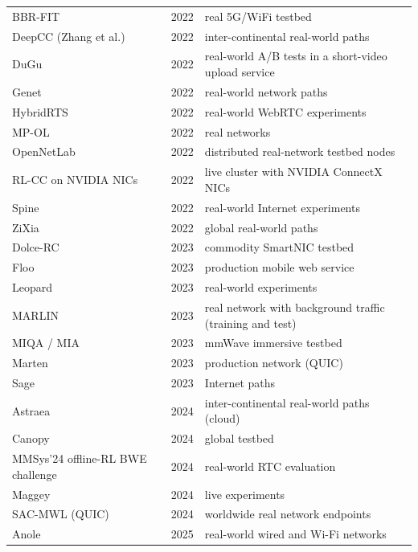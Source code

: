 \begin{small}
\begin{longtable}{@{}L{4.0cm}lL{8.6cm}@{}}
BBR-FIT~\cite{xie2022bbr} & 2022 & real 5G/WiFi testbed \\
DeepCC (Zhang et al.)~\cite{zhang2022deepcc} & 2022 & inter-continental real-world paths \\
DuGu~\cite{huang2022learned} & 2022 & real-world A/B tests in a short-video upload service \\
Genet~\cite{xia2022genet} & 2022 & real-world network paths \\
HybridRTS~\cite{zhang2022hybridrts} & 2022 & real-world WebRTC experiments \\
MP-OL~\cite{zhuang2022achieving} & 2022 & real networks \\
OpenNetLab~\cite{eo2022opennetlab} & 2022 & distributed real-network testbed nodes \\
RL-CC on NVIDIA NICs~\cite{fuhrer2023nvidia} & 2022 & live cluster with NVIDIA ConnectX NICs \\
Spine~\cite{tian2024spine} & 2022 & real-world Internet experiments \\
ZiXia~\cite{jia2022zixia} & 2022 & global real-world paths \\
Dolce-RC~\cite{ye2023data} & 2023 & commodity SmartNIC testbed \\
Floo~\cite{zhang2023floo} & 2023 & production mobile web service \\
Leopard~\cite{liu2023leopard} & 2023 & real-world experiments \\
MARLIN~\cite{galliera2023marlin} & 2023 & real network with background traffic (training and test) \\
MIQA / MIA~\cite{wu2024miqa} & 2023 & mmWave immersive testbed \\
Marten~\cite{zhou2025safety} & 2023 & production network (QUIC) \\
Sage~\cite{yen2023sage} & 2023 & Internet paths \\
Astraea~\cite{liao2024astraea} & 2024 & inter-continental real-world paths (cloud) \\
Canopy~\cite{yang2024canopy} & 2024 & global testbed \\
MMSys'24 offline-RL BWE challenge~\cite{khairy2024acm} & 2024 & real-world RTC evaluation \\
Maggey~\cite{wei2024breaking} & 2024 & live experiments \\
SAC-MWL (QUIC)~\cite{blokhin2024deep} & 2024 & worldwide real network endpoints \\
Anole~\cite{han2025anole} & 2025 & real-world wired and Wi-Fi networks \\

\end{longtable}
\end{small}
